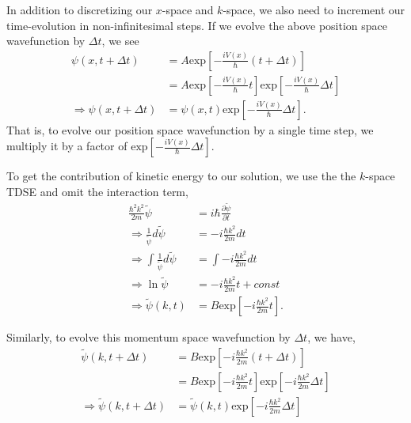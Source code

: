 \documentclass{booknotes}
\begin{document}
In addition to discretizing our $x$-space and $k$-space, we also need to increment our time-evolution in non-infinitesimal steps. 
If we evolve the above position space wavefunction by $\Delta t$, we see
	\begin{align}
	 \psi(x,t+\Delta t) &= A \text{exp} \left[-\frac{iV(x)}{\hbar} (t+\Delta t) \right]\\
	 &= A \text{exp} \left[-\frac{iV(x)}{\hbar} t \right]\text{exp} \left[-\frac{iV(x)}{\hbar} \Delta t\right]\\
	 \Rightarrow \psi(x,t+\Delta t)  &=  \psi(x,t) \text{exp} \left[-\frac{iV(x)}{\hbar} \Delta t\right].
	\end{align}
That is, to evolve our position space wavefunction by a single time step, we multiply it by a factor of  
$\text{exp} \left[-\frac{iV(x)}{\hbar} \Delta t\right]$.





To get the contribution of kinetic energy to our solution, we use the the $k$-space TDSE and omit the interaction term,
	\begin{align}
	\frac { \hbar ^ { 2 } k ^ { 2 } } { 2 m } \widetilde { \psi }&=i \hbar \frac { \partial \widetilde { \psi } } { \partial t }\\
	\Rightarrow \frac{1}{\widetilde { \psi }} d \widetilde { \psi }
	&=-i \frac { \hbar k ^ { 2 } } { 2 m }dt \\
	 \Rightarrow \int \frac{1}{\widetilde { \psi }} d \widetilde { \psi }
	&= \int-i \frac { \hbar k ^ { 2 } } { 2 m }dt \\
	\Rightarrow \ln \widetilde { \psi } &= -i \frac { \hbar k ^ { 2 } } { 2 m } t + const\\
	\Rightarrow \widetilde { \psi } (k,t) &= B  \text{exp} \left[-i \frac { \hbar k ^ { 2 } } { 2 m }  t\right].
	\end{align}

Similarly, to evolve this momentum space wavefunction by $\Delta t$, we have,
	\begin{align}
	\widetilde { \psi } (k,t+\Delta t) &= B  \text{exp} \left[-i \frac { \hbar k ^ { 2 } } { 2 m } (t +\Delta t)\right]\\
	&= B  \text{exp} \left[-i \frac { \hbar k ^ { 2 } } { 2 m } t\right]\text{exp} \left[-i \frac { \hbar k ^ { 2 } } { 2 m }  \Delta t\right]\\
	\Rightarrow \widetilde { \psi } (k,t+\Delta t) &=\widetilde { \psi } (k, t)
	\text{exp} \left[-i \frac { \hbar k ^ { 2 } } { 2 m }  \Delta t\right]\\
	\end{align}
\end{document}
